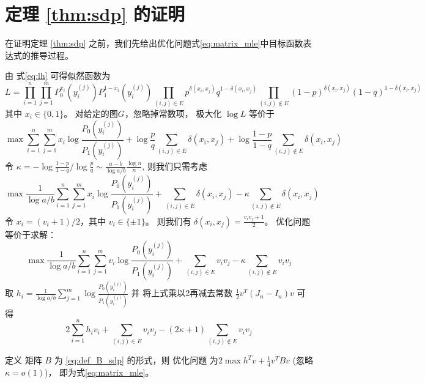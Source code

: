\section{定理 \ref{thm:sdp} 的证明}
\label{sec:thm_sdp_proof}
在证明定理 \ref{thm:sdp} 之前，我们先给出优化问题式\eqref{eq:matrix_mle}中目标函数表达式的推导过程。

由 式\eqref{eq:lh} 可得似然函数为
$$
L=\prod_{i=1}^n \prod_{j=1}^m P_0^{x_i}(y_i^{(j)})P_1^{1-x_i}(y_i^{(j)})
\prod_{(i,j) \in E} p^{\delta(x_i, x_j)}q^{1-\delta(x_i, x_j)}
\prod_{(i,j)\not\in E} (1-p)^{\delta(x_i, x_j)}(1-q)^{1-\delta(x_i, x_j)}
$$
其中 $x_i \in \{0,1\}$。
对给定的图$G$，忽略掉常数项， 极大化 $ \log L$ 等价于
$$
\max \sum_{i=1}^n \sum_{j=1}^m x_i \log \frac{P_0(y_i^{(j)})}{P_1(y_i^{(j)})}
+\log\frac{p}{q}\sum_{(i,j) \in E} \delta(x_i, x_j)
+\log \frac{1-p}{1-q}\sum_{(i,j)\not\in E} \delta(x_i, x_j)
$$
令 $\kappa = -\log\frac{1-p}{1-q} / \log\frac{p}{q} \sim \frac{a-b}{\log a/b}\frac{\log n}{n}$,
则我们只需考虑
$$
\max \frac{1}{\log a/b}\sum_{i=1}^n \sum_{j=1}^m x_i \log \frac{P_0(y_i^{(j)})}{P_1(y_i^{(j)})}
+\sum_{(i,j) \in E} \delta(x_i, x_j)
-\kappa\sum_{(i,j)\not\in E} \delta(x_i, x_j)
$$
令 $x_i = (v_i+1)/2$，其中 $v_i \in \{\pm 1 \}$。
则我们有 $\delta(x_i, x_j) = \frac{v_i v_j + 1}{2}$。
优化问题等价于求解：
$$
\max \frac{1}{\log a/b}\sum_{i=1}^n \sum_{j=1}^m v_i \log \frac{P_0(y_i^{(j)})}{P_1(y_i^{(j)})}
+\sum_{(i,j) \in E} v_i v_j
-\kappa\sum_{(i,j)\not\in E} v_i v_j
$$
取 $h_i = \frac{1}{\log a/b}\sum_{j=1}^m \log \frac{P_0(y_i^{(j)})}{P_1(y_i^{(j)})}$
并
将上式乘以2再减去常数 $\frac{1}{2}v^T(J_n-I_n)v$ 可得
$$
2\sum_{i=1}^n h_iv_i + \sum_{(i,j)\in E} v_i v_j - (2\kappa+1) \sum_{(i,j)\not\in E} v_i v_j
$$

定义 矩阵 $B$ 为 \eqref{eq:def_B_sdp} 的形式，则
优化问题 为$2\max h^T v + \frac{1}{4}v^T B v$ (忽略 $\kappa=o(1)$)，
即为式\eqref{eq:matrix_mle}。

